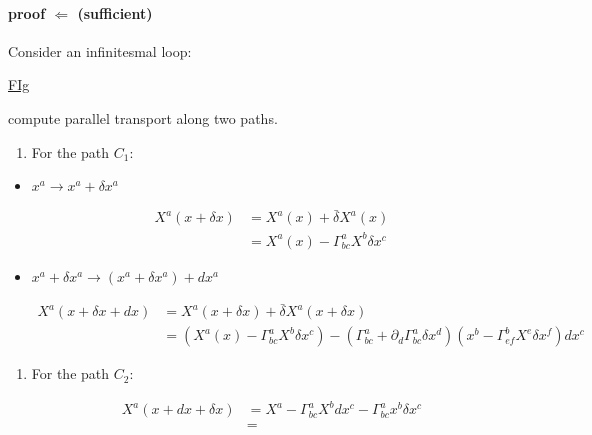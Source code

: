 \paragraph{proof $\Leftarrow$ (sufficient)} %

Consider an infinitesmal loop:

\underline{FIg}

compute parallel transport along two paths.

\begin{enumerate}
	\item For the path $C_1$:

\end{enumerate}
	\begin{itemize}
		\item $x^{a}\to x^{a} + \delta x^{a}$

\begin{equation}
\begin{aligned}
X^{a}(x+\delta x)
&= X^{a}(x) + \bar{\delta} X^{a}(x)\\
&= X^{a}(x) - \Gamma^{a}_{bc} X^{b}\delta x^{c}
\end{aligned}
\end{equation}

	\end{itemize}
	\begin{itemize}
		\item $x^{a}+\delta x^{a}\to (x^{a} + \delta x^{a}) + dx^{a}$

\begin{equation}
\begin{aligned}
X^{a}(x+\delta x+dx)
&= X^{a}(x+\delta x) + \bar{\delta} X^{a}(x+\delta x)\\
&= \left(X^{a}(x) - \Gamma^{a}_{bc} X^{b}\delta x^{c}\right)
- \left(\Gamma^{a}_{bc}+\partial_{d}\Gamma^{a}_{bc}\delta x^{d}\right)
\left(x^{b} - \Gamma^{b}_{ef}X^{e}\delta x^{f}\right) dx^{c}
\end{aligned}
\end{equation}

	\end{itemize}

\begin{enumerate}
	\item For the path $C_2$:

\begin{equation}
\begin{aligned}
X^{a}(x+dx+\delta x)
&= X^{a} - \Gamma^{a}_{bc} X^{b} dx^{c} - \Gamma^{a}_{bc} x^{b}\delta x^{c}\\
&=
\end{aligned}
\end{equation}

\end{enumerate}

